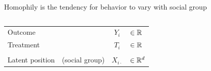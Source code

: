 \documentclass[aspectratio=169]{beamer}
\theoremstyle{remark}
\begin{document}
\begin{frame}{Homophily is the tendency for behavior to vary with social group}
\begin{columns}
\begin{column}{0.6\textwidth}
\begin{table}[]
\begin{tabular}{llcl}
                    Outcome         &                & $Y_i$         & $\in \mathbb{R}$                \\
                    Treatment       &                & $T_i$         & $\in \mathbb{R}$                \\
                                    &                &               &                         \\
                    Latent position & (social group) & $X_{i \cdot}$ & $\in \mathbb{R}^d$              \\
                \end{tabular}
            \end{table}
        \end{column}
    \end{columns}
\end{frame}
\end{document}
